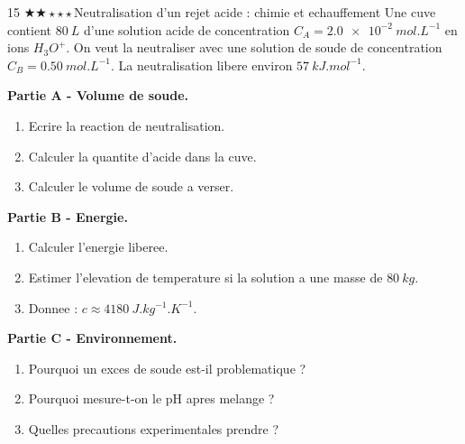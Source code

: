 \documentclass[11pt,a4paper]{article}
\newcommand{\difftwo}{\(\bigstar\bigstar\star\star\star\)}
\begin{document}
\begin{probleme}{15 \difftwo}{Neutralisation d'un rejet acide : chimie et echauffement}
Une cuve contient \(\SI{80}{L}\) d'une solution acide de concentration \(C_A=\SI{2.0e-2}{mol.L^{-1}}\) en ions \(H_3O^+\). On veut la neutraliser avec une solution de soude de concentration \(C_B=\SI{0.50}{mol.L^{-1}}\). La neutralisation libere environ \(\SI{57}{kJ.mol^{-1}}\).

\textbf{Partie A - Volume de soude.}
\begin{enumerate}
\item Ecrire la reaction de neutralisation.
\item Calculer la quantite d'acide dans la cuve.
\item Calculer le volume de soude a verser.
\end{enumerate}

\textbf{Partie B - Energie.}
\begin{enumerate}[resume]
\item Calculer l'energie liberee.
\item Estimer l'elevation de temperature si la solution a une masse de \(\SI{80}{kg}\).
\item Donnee : \(c\approx\SI{4180}{J.kg^{-1}.K^{-1}}\).
\end{enumerate}

\textbf{Partie C - Environnement.}
\begin{enumerate}[resume]
\item Pourquoi un exces de soude est-il problematique ?
\item Pourquoi mesure-t-on le pH apres melange ?
\item Quelles precautions experimentales prendre ?
\end{enumerate}
\end{probleme}
\end{document}

